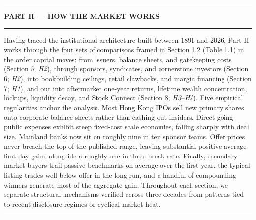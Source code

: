 \documentclass[11pt,letterpaper]{article}
\begin{document}
\par\vspace{16pt}
\noindent\rule{\linewidth}{0.85pt}\par\vspace{5pt}
{\centering\Large\bfseries\color{NavyAccent} \texorpdfstring{PART II — HOW THE MARKET WORKS}{PART II — HOW THE MARKET WORKS}\par}
\vspace{4pt}\noindent\rule{\linewidth}{0.85pt}\par\vspace{8pt}
Having traced the institutional architecture built between 1891 and 2026, Part II works through the four sets of comparisons framed in Section 1.2 (Table 1.1) in the order capital moves: from issuers, balance sheets, and gatekeeping costs (Section 5; \textit{H2}), through sponsors, syndicates, and cornerstone investors (Section 6; \textit{H2}), into bookbuilding ceilings, retail clawbacks, and margin financing (Section 7; \textit{H1}), and out into aftermarket one-year returns, lifetime wealth concentration, lockups, liquidity decay, and Stock Connect (Section 8; \textit{H3}–\textit{H4}). Five empirical regularities anchor the analysis. Most Hong Kong IPOs sell new primary shares onto corporate balance sheets rather than cashing out insiders. Direct going-public expenses exhibit steep fixed-cost scale economies, falling sharply with deal size. Mainland banks now sit on roughly nine in ten sponsor teams. Offer prices never breach the top of the published range, leaving substantial positive average first-day gains alongside a roughly one-in-three break rate. Finally, secondary-market buyers trail passive benchmarks on average over the first year, the typical listing trades well below offer in the long run, and a handful of compounding winners generate most of the aggregate gain. Throughout each section, we separate structural mechanisms verified across three decades from patterns tied to recent disclosure regimes or cyclical market heat.

\par\medskip\noindent\rule{\linewidth}{0.35pt}\par\medskip
\end{document}
